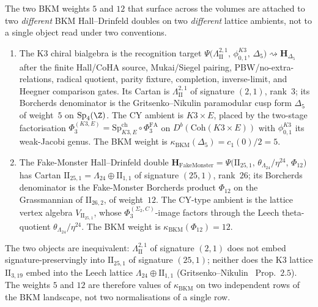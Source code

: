 \begin{proposition}%
\label{prop:kappa-bkm-cross-volume-reconciliation}%
%
The two BKM weights $5$ and $12$ that surface across the volumes are
attached to two \emph{different} BKM Hall--Drinfeld doubles on two
\emph{different} lattice ambients, not to a single object read under
two conventions.
\begin{enumerate}[label=\textup{(\roman*)}]
 \item The K3 chiral bialgebra is the recognition target
 $\Psi\bigl(\Lambda^{2,1}_{\mathrm{II}},\,
 \phi_{0,1}^{K3},\, \Delta_5\bigr)\rightsquigarrow
 \mathbf H_{\Delta_5}$ after the finite Hall/CoHA source,
 Mukai/Siegel pairing, PBW/no-extra-relations, radical quotient,
 parity fixture, completion, inverse-limit, and Heegner comparison
 gates. Its Cartan is
 $\Lambda^{2,1}_{\mathrm{II}}$ of signature $(2,1)$, rank~$3$; its
 Borcherds denominator is the Gritsenko--Nikulin paramodular cusp form
$\Delta_5$ of weight~$5$ on $\mathrm{Sp}_4(\Z)$. The CY ambient is
$K3\times E$, placed by the two-stage factorisation
 $\Phi_3^{(K3,E)} = \mathrm{Sp}^{\mathrm{ch}}_{K3,E}\circ\Phi^{\mathrm{FA}}_3$
on $D^b(\mathrm{Coh}(K3\times E))$ with
 $\phi_{0,1}^{K3}$ its weak-Jacobi genus. The BKM weight is
 $\kappa_{\mathrm{BKM}}(\Delta_5) = c_1(0)/2 = 5$.
 \item The Fake-Monster Hall--Drinfeld double
 $\mathbf H_{\mathrm{FakeMonster}} = \Psi\bigl(\mathrm{II}_{25,1},\,
 \theta_{\Lambda_{24}}/\eta^{24},\, \Phi_{12}\bigr)$ has Cartan
 $\mathrm{II}_{25,1} = \Lambda_{24}\oplus\mathrm{II}_{1,1}$ of signature
 $(25,1)$, rank~$26$; its Borcherds denominator is the Fake-Monster
 Borcherds product $\Phi_{12}$ on the Grassmannian of
 $\mathrm{II}_{26,2}$, of weight~$12$. The CY-type ambient is the
 lattice vertex algebra $V_{\mathrm{II}_{25,1}}$, whose
 $\Phi_3^{(\Sigma_2,C)}$-image
 factors through the Leech theta-quotient
 $\theta_{\Lambda_{24}}/\eta^{24}$. The BKM weight is
 $\kappa_{\mathrm{BKM}}(\Phi_{12}) = 12$.
\end{enumerate}
The two objects are inequivalent: $\Lambda^{2,1}_{\mathrm{II}}$ of
signature $(2,1)$ does not embed signature-preservingly into
$\mathrm{II}_{25,1}$ of signature $(25,1)$; neither does the K3 lattice
$\mathrm{II}_{3,19}$ embed into the Leech lattice
$\Lambda_{24}\oplus\mathrm{II}_{1,1}$
(Gritsenko--Nikulin~\cite{GritsenkoNikulin1998}
Prop.~$2.5$). The weights $5$ and $12$ are therefore values of
$\kappa_{\mathrm{BKM}}$ on two independent rows of the BKM landscape,
not two normalisations of a single row.
\end{proposition}

